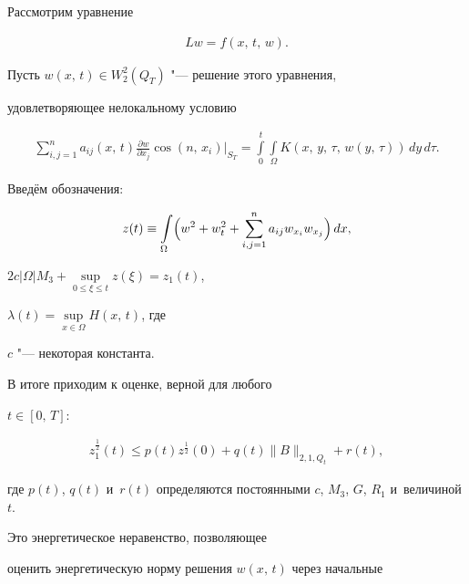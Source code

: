 

Рассмотрим уравнение


\begin{eqnarray}


\label{dmitr:gb} Lw=f(x,\,t,\,w).


\end{eqnarray}


Пусть $w(x,\,t)\in W_2^2(Q_T)$ "--- решение этого уравнения,


удовлетворяющее нелокальному условию


\begin{eqnarray}


\label{dmitr:gc}


\sum\limits_{i,j=1}^n a_{ij}(x,\,t)\frac{\partial w}{\partial x_j}\cos(n,\,x_i)\Big|_{S_T}= \int\limits_0^t\int\limits_{\Omega}K(x,\,y,\,\tau,\,w(y,\,\tau))\,dy\,d\tau.


\end{eqnarray}


Введём обозначения:


$$z(t)\equiv


\int\limits_{\Omega}\Bigl(w^2+w_{t}^2+\sum\limits_{i,j=1}^{n}


a_{ij}w_{x_{i}}w_{x_{j}}\Bigr)\,dx,$$


$2c|\Omega|M_3+


\sup\limits_{0\le\xi\le


t}z(\xi)=z_1(t)$,


$\lambda(t)=\sup\limits_{x\in\Omega}H(x,\,t)$, где


$c$ "--- некоторая константа.








В итоге приходим к оценке, верной для любого


$t\in[0,\,T]$:


\begin{eqnarray}


\label{dmitr:g11}


z_1^{\frac 12}(t)\le p(t)z^{\frac 12}(0)+q(t)\|B\|_{2,1,Q_{t}}+r(t),


\end{eqnarray}


где $p(t)$, $q(t)$ и~$r(t)$ определяются постоянными $c$, $M_3$, $G$, $R_1$ и~величиной $t$.


Это энергетическое неравенство, позволяющее


оценить энергетическую норму решения $w(x,\,t)$ через начальные


